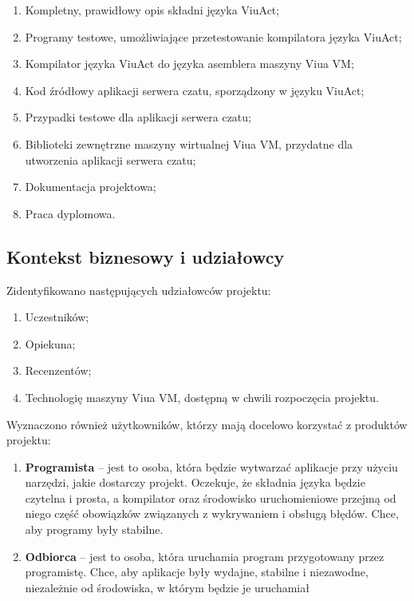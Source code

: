 \documentclass[11pt,oneside,a4paper,titlepage,onecolumn]{article}
\begin{document}
\begin{enumerate}
    \item Kompletny, prawidłowy opis składni języka ViuAct;
    \item Programy testowe, umożliwiające przetestowanie kompilatora języka ViuAct;
    \item Kompilator języka ViuAct do języka asemblera maszyny Viua VM;
    \item Kod źródłowy aplikacji serwera czatu, sporządzony w języku ViuAct;
    \item Przypadki testowe dla aplikacji serwera czatu;
    \item Biblioteki zewnętrzne maszyny wirtualnej Viua VM, przydatne dla utworzenia aplikacji serwera czatu;
    \item Dokumentacja projektowa;
    \item Praca dyplomowa.
\end{enumerate}

\subsection{Kontekst biznesowy i udziałowcy}

Zidentyfikowano następujących udziałowców projektu:

\begin{enumerate}
	\item Uczestników;
    \item Opiekuna;
    \item Recenzentów;
    \item Technologię maszyny Viua VM, dostępną w chwili rozpoczęcia projektu.
\end{enumerate}

Wyznaczono również użytkowników, którzy mają docelowo korzystać z produktów projektu:

\begin{enumerate}
	\item \textbf{Programista} – jest to osoba, która będzie wytwarzać aplikacje przy użyciu narzędzi, jakie dostarczy projekt. Oczekuje, że składnia języka będzie czytelna i prosta, a kompilator oraz środowisko uruchomieniowe przejmą od niego część obowiązków związanych z wykrywaniem i obsługą błędów. Chce, aby programy były stabilne.
    \item \textbf{Odbiorca} – jest to osoba, która uruchamia program przygotowany przez programistę. Chce, aby aplikacje były wydajne, stabilne i niezawodne, niezależnie od środowiska, w którym będzie je uruchamiał
\end{enumerate}
\end{document}
